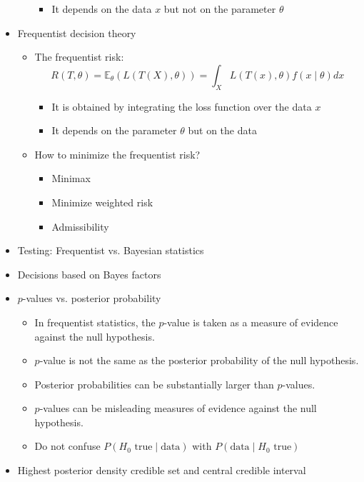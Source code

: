 \documentclass[a4paper]{article}
\begin{document}
\begin{itemize}
\begin{itemize}
\begin{itemize}
            \item It depends on the data $x$ but not on the parameter $\theta$
        \end{itemize}
    \end{itemize}
    \item Frequentist decision theory
    \begin{itemize}
        \item The frequentist risk:
        \[R(T,\theta)=\mathbb{E}_{\theta}(L(T(X),\theta))=\int_{X}L(T(x),\theta)f(x\mid\theta)dx \]
        \begin{itemize}
            \item It is obtained by integrating the loss function over the data $x$
            \item It depends on the parameter $\theta$ but on the data
        \end{itemize}
        \item How to minimize the frequentist risk?
        \begin{itemize}
            \item Minimax
            \item Minimize weighted risk
            \item Admissibility
        \end{itemize}
    \end{itemize}
    \item Testing: Frequentist vs. Bayesian statistics
    \item Decisions based on Bayes factors
    \item $p$-values vs. posterior probability
    \begin{itemize}
        \item In frequentist statistics, the $p$-value is taken as a measure of evidence against the null hypothesis.
        \item $p$-value is not the same as the posterior probability of the null hypothesis.
        \item Posterior probabilities can be substantially larger than $p$-values.
        \item $p$-values can be misleading measures of evidence against the null hypothesis.
        \item Do not confuse $P(H_0\text{ true}\mid \text{data})$ with $P(\text{data}\mid H_0\text{ true})$
    \end{itemize}
    \item Highest posterior density credible set and central credible interval

\end{itemize}
\end{document}
